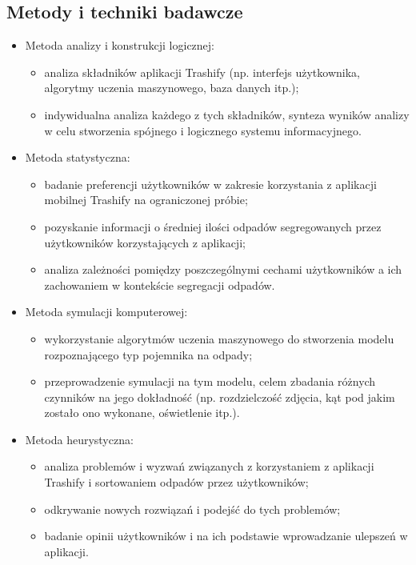 \documentclass[12pt, a4paper, twoside, openany]{book}
\begin{document}
\subsection{Metody i techniki badawcze}
\begin{itemize}
    \item Metoda analizy i konstrukcji logicznej:
          \begin{itemize}
              \item analiza składników aplikacji Trashify (np. interfejs użytkownika, algorytmy uczenia maszynowego, baza danych itp.);
              \item indywidualna analiza każdego z tych składników,
                    synteza wyników analizy w celu stworzenia spójnego i logicznego systemu informacyjnego.
          \end{itemize}
    \item Metoda statystyczna:
          \begin{itemize}
              \item badanie preferencji użytkowników w zakresie korzystania z aplikacji mobilnej Trashify na ograniczonej próbie;
              \item pozyskanie informacji o średniej ilości odpadów segregowanych przez użytkowników korzystających z aplikacji;
              \item analiza zależności pomiędzy poszczególnymi cechami użytkowników a ich zachowaniem w kontekście segregacji odpadów.
          \end{itemize}
    \item Metoda symulacji komputerowej:
          \begin{itemize}
              \item wykorzystanie algorytmów uczenia maszynowego do stworzenia modelu rozpoznającego typ pojemnika na odpady;
              \item przeprowadzenie symulacji na tym modelu, celem zbadania różnych czynników na jego dokładność (np. rozdzielczość zdjęcia, kąt pod jakim zostało ono wykonane, oświetlenie itp.).
          \end{itemize}
    \item Metoda heurystyczna:
          \begin{itemize}
              \item analiza problemów i wyzwań związanych z korzystaniem z aplikacji Trashify i sortowaniem odpadów przez użytkowników;
              \item odkrywanie nowych rozwiązań i podejść do tych problemów;
              \item badanie opinii użytkowników i na ich podstawie wprowadzanie ulepszeń w aplikacji.
          \end{itemize}
\end{itemize}
\end{document}
